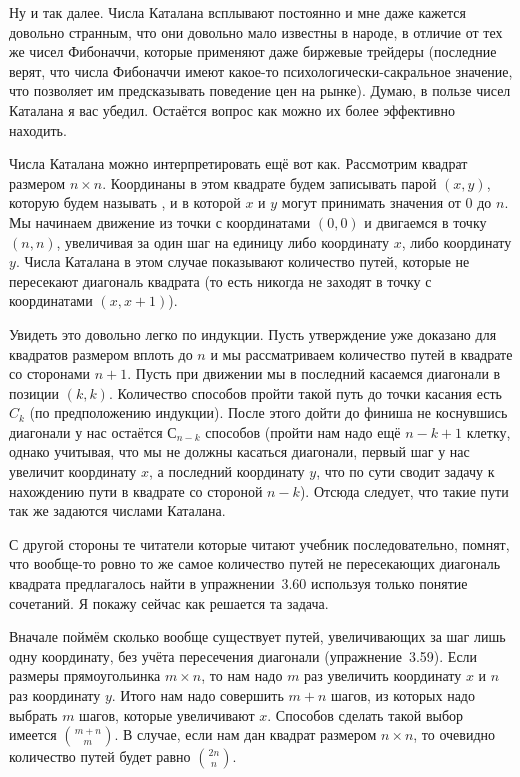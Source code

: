 Ну и так далее. Числа Каталана всплывают постоянно и мне даже кажется довольно странным, что они довольно мало известны в народе, в отличие от тех же чисел Фибоначчи, которые применяют даже биржевые трейдеры (последние верят, что числа Фибоначчи имеют какое-то психологически-сакральное значение, что позволяет им предсказывать поведение цен на рынке). Думаю, в пользе чисел Каталана я вас убедил. Остаётся вопрос как можно их более эффективно находить.

Числа Каталана можно интерпретировать ещё вот как. Рассмотрим квадрат размером $n\times n$. Координаны в этом квадрате будем записывать парой $(x, y)$, которую будем называть , и в которой $x$ и $y$ могут принимать значения от 0 до $n$. Мы начинаем движение из точки с координатами $(0, 0)$ и двигаемся в точку $(n, n)$, увеличивая за один шаг на единицу либо координату $x$, либо координату $y$. Числа Каталана в этом случае показывают количество путей, которые не пересекают диагональ квадрата (то есть никогда не заходят в точку с координатами $(x, x+1)$).

Увидеть это довольно легко по индукции. Пусть утверждение уже доказано для квадратов размером вплоть до $n$ и мы рассматриваем количество путей в квадрате со сторонами $n+1$. Пусть при движении мы в последний касаемся диагонали в позиции $(k, k)$. Количество способов пройти такой путь до точки касания есть $C_k$ (по предположению индукции). После этого дойти до финиша не коснувшись диагонали у нас остаётся $С_{n-k}$ способов (пройти нам надо ещё $n-k+1$ клетку, однако учитывая, что мы не должны касаться диагонали, первый шаг у нас увеличит координату $x$, а последний координату $y$, что по сути сводит задачу к нахождению пути в квадрате со стороной $n-k$). Отсюда следует, что такие пути так же задаются числами Каталана.

С другой стороны те читатели которые читают учебник последовательно, помнят, что вообще-то ровно то же самое количество путей не пересекающих диагональ квадрата предлагалось найти в упражнении~3.60 используя только понятие сочетаний. Я покажу сейчас как решается та задача.

Вначале поймём сколько вообще существует путей, увеличивающих за шаг лишь одну координату, без учёта пересечения диагонали (упражнение~3.59). Если размеры прямоугольинка $m\times n$, то нам надо $m$ раз увеличить координату $x$ и $n$ раз координату $y$. Итого нам надо совершить $m+n$ шагов, из которых надо выбрать $m$ шагов, которые увеличивают $x$. Способов сделать такой выбор имеется ${m + n \choose m}$. В случае, если нам дан квадрат размером $n\times n$, то очевидно количество путей будет равно ${2n\choose n}$.

